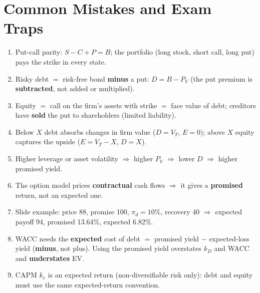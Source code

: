 \section{Common Mistakes and Exam Traps}
\begin{trapbox}
\begin{enumerate}[leftmargin=*]
  \item Put-call parity: $S-C+P=B$; the portfolio (long stock, short call, long put) pays the strike in every state.
  \item Risky debt $=$ risk-free bond \textbf{minus} a put: $D=B-P_V$ (the put premium is \textbf{subtracted}, not added or multiplied).
  \item Equity $=$ call on the firm's assets with strike $=$ face value of debt; creditors have \textbf{sold} the put to shareholders (limited liability).
  \item Below $X$ debt absorbs changes in firm value ($D=V_T$, $E=0$); above $X$ equity captures the upside ($E=V_T-X$, $D=X$).
  \item Higher leverage or asset volatility $\Rightarrow$ higher $P_V$ $\Rightarrow$ lower $D$ $\Rightarrow$ higher promised yield.
  \item The option model prices \textbf{contractual} cash flows $\Rightarrow$ it gives a \textbf{promised} return, not an expected one.
  \item Slide example: price 88, promise 100, $\pi_d=10\%$, recovery 40 $\Rightarrow$ expected payoff 94, promised 13.64\%, expected 6.82\%.
  \item WACC needs the \textbf{expected} cost of debt $=$ promised yield $-$ expected-loss yield (\textbf{minus}, not plus). Using the promised yield overstates $k_D$ and WACC and \textbf{understates} EV.
  \item CAPM $k_e$ is an expected return (non-diversifiable risk only): debt and equity must use the same expected-return convention.
\end{enumerate}
\end{trapbox}
